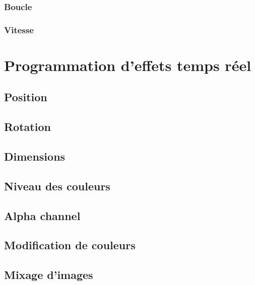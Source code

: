 \documentclass[
]{book}
\begin{document}
\hypertarget{boucle}{%
\subsubsection{Boucle}\label{boucle}}

\hypertarget{vitesse}{%
\subsubsection{Vitesse}\label{vitesse}}

\hypertarget{programmation-deffets-temps-ruxe9el}{%
\section{Programmation d'effets temps réel}\label{programmation-deffets-temps-ruxe9el}}

\hypertarget{position-1}{%
\subsection{Position}\label{position-1}}

\hypertarget{rotation}{%
\subsection{Rotation}\label{rotation}}

\hypertarget{dimensions}{%
\subsection{Dimensions}\label{dimensions}}

\hypertarget{niveau-des-couleurs}{%
\subsection{Niveau des couleurs}\label{niveau-des-couleurs}}

\hypertarget{alpha-channel-1}{%
\subsection{Alpha channel}\label{alpha-channel-1}}

\hypertarget{modification-de-couleurs}{%
\subsection{Modification de couleurs}\label{modification-de-couleurs}}

\hypertarget{mixage-dimages}{%
\subsection{Mixage d'images}\label{mixage-dimages}}
\end{document}
